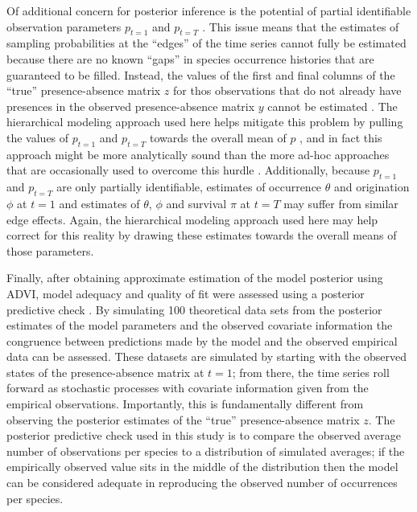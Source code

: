 \documentclass[12pt,letterpaper]{article}
\begin{document}
Of additional concern for posterior inference is the potential of partial identifiable observation parameters \(p_{t = 1}\) and \(p_{t = T}\) \citep{Royle2008}. This issue means that the estimates of sampling probabilities at the ``edges'' of the time series cannot fully be estimated because there are no known ``gaps'' in species occurrence histories that are guaranteed to be filled. Instead, the values of the first and final columns of the ``true'' presence-absence matrix \(z\) for thos observations that do not already have presences in the observed presence-absence matrix \(y\) cannot be estimated \citep{Royle2008}. The hierarchical modeling approach used here helps mitigate this problem by pulling the values of \(p_{t = 1}\) and \(p_{t = T}\) towards the overall mean of \(p\) \citep{Gelman2013d}, and in fact this approach might be more analytically sound than the more ad-hoc approaches that are occasionally used to overcome this hurdle \citep{Royle2008}. Additionally, because \(p_{t = 1}\) and \(p_{t = T}\) are only partially identifiable, estimates of occurrence \(\theta\) and origination \(\phi\) at \(t = 1\) and estimates of \(\theta\), \(\phi\) and survival \(\pi\) at \(t = T\) may suffer from similar edge effects. Again, the hierarchical modeling approach used here may help correct for this reality by drawing these estimates towards the overall means of those parameters.


Finally, after obtaining approximate estimation of the model posterior using ADVI, model adequacy and quality of fit were assessed using a posterior predictive check \citep{Gelman2013d}. By simulating 100 theoretical data sets from the posterior estimates of the model parameters and the observed covariate information the congruence between predictions made by the model and the observed empirical data can be assessed. These datasets are simulated by starting with the observed states of the presence-absence matrix at \(t = 1\); from there, the time series roll forward as stochastic processes with covariate information given from the empirical observations. Importantly, this is fundamentally different from observing the posterior estimates of the ``true'' presence-absence matrix \(z\). The posterior predictive check used in this study is to compare the observed average number of observations per species to a distribution of simulated averages; if the empirically observed value sits in the middle of the distribution then the model can be considered adequate in reproducing the observed number of occurrences per species. 
\end{document}

